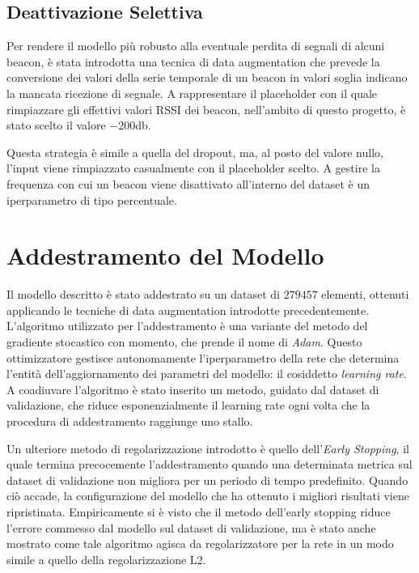 \subsection{Deattivazione Selettiva}
Per rendere il modello più robusto alla eventuale perdita di segnali di alcuni
beacon, è stata introdotta una tecnica di data augmentation che prevede la
conversione dei valori della serie temporale di un beacon in valori soglia
indicano la mancata ricezione di segnale. A rappresentare il placeholder con il
quale rimpiazzare gli effettivi valori RSSI dei beacon, nell'ambito di questo
progetto, è stato scelto il valore $-200$db.

Questa strategia è simile a quella del dropout, ma, al posto del valore nullo,
l'input viene rimpiazzato casualmente con il placeholder scelto. A gestire la
frequenza con cui un beacon viene disattivato all'interno del dataset è un
iperparametro di tipo percentuale.
\section{Addestramento del Modello}\label{sec:training}
Il modello descritto è stato addestrato su un dataset di $279457$ elementi,
ottenuti applicando le tecniche di data augmentation introdotte
precedentemente. L'algoritmo utilizzato per l'addestramento è una variante del
metodo del gradiente stocastico con momento, che prende il nome di \emph{Adam}.
Questo ottimizzatore gestisce autonomamente l'iperparametro della rete che
determina l'entità dell'aggiornamento dei parametri del modello: il cosiddetto
\emph{learning rate}. A coadiuvare l'algoritmo è stato inserito un metodo,
guidato dal dataset di validazione, che riduce esponenzialmente il learning
rate ogni volta che la procedura di addestramento raggiunge uno stallo.

Un ulteriore metodo di regolarizzazione introdotto è quello dell'\emph{Early %
  Stopping}, il quale termina precocemente l'addestramento quando una
determinata metrica sul dataset di validazione non migliora per un periodo di
tempo predefinito. Quando ciò accade, la configurazione
del modello che ha ottenuto i migliori risultati viene ripristinata.
Empiricamente si è visto che il metodo dell'early stopping riduce l'errore
commesso dal modello sul dataset di validazione, ma è stato anche mostrato come
tale algoritmo agisca da regolarizzatore per la rete in un modo simile a quello
della regolarizzazione L2\cite{bishop-regularization}.

